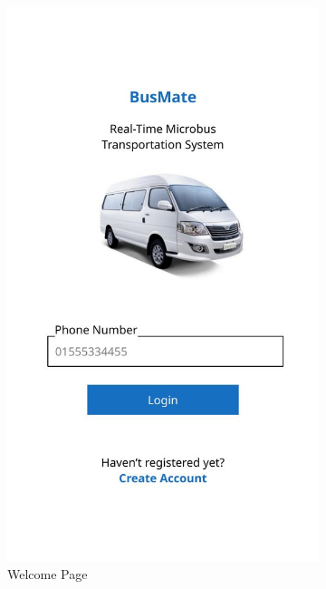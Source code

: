 \documentclass{BusMateSRS}
\begin{document}
\begin{figure}[h!]
  \centering
  \begin{subfigure}[b]{0.3\textwidth}
    \centering
    \includegraphics[width=\textwidth]{images-ui/ui-out-1.jpg}
    \caption{Welcome Page}
    \label{fig:ui1}
  \end{subfigure}
  \hfill
  \begin{subfigure}[b]{0.3\textwidth}
    \centering

\end{subfigure}
\end{figure}
\end{document}
